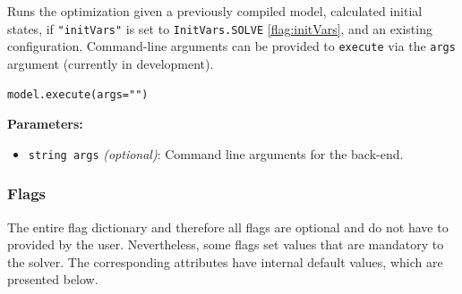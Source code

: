\documentclass[12pt]{article}
\begin{document}
\begin{mdframed}[backgroundcolor=gray!10, roundcorner=10pt,
	linewidth=1pt]
	
	Runs the optimization given a previously compiled model, calculated initial states, if \texttt{"initVars"} is set to \texttt{InitVars.SOLVE} \eqref{flag:initVars}, and an existing configuration.
	Command-line arguments can be provided to \texttt{execute} via the \texttt{args} argument (currently in development).
	
	\begin{lstlisting}
model.execute(args="")
	\end{lstlisting}
	\label{execute}
	\textbf{Parameters:}
	\begin{itemize}
		\item \texttt{string args} \emph{(optional)}: Command line arguments for the back-end.
	\end{itemize}
	
\end{mdframed}


\subsubsection{Flags}
\label{c:flags}

The entire flag dictionary and therefore all flags are optional and do not have
to provided by the user. Nevertheless, some flags set values that are mandatory
to the solver. The corresponding attributes have internal default values, which
are presented below.
\end{document}
